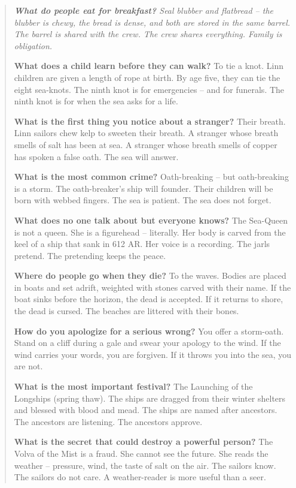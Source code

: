 \documentclass[12pt,oneside]{book}
\newenvironment{almanac}
  {\begin{quote}\small\itshape}
  {\end{quote}}
\begin{document}
\vspace{1em}
\begin{almanac}
\textbf{What do people eat for breakfast?} Seal blubber and flatbread -- the blubber is chewy, the bread is dense, and both are stored in the same barrel. The barrel is shared with the crew. The crew shares everything. Family is obligation.

\textbf{What does a child learn before they can walk?} To tie a knot. Linn children are given a length of rope at birth. By age five, they can tie the eight sea-knots. The ninth knot is for emergencies -- and for funerals. The ninth knot is for when the sea asks for a life.

\textbf{What is the first thing you notice about a stranger?} Their breath. Linn sailors chew kelp to sweeten their breath. A stranger whose breath smells of salt has been at sea. A stranger whose breath smells of copper has spoken a false oath. The sea will answer.

\textbf{What is the most common crime?} Oath-breaking -- but oath-breaking is a storm. The oath-breaker's ship will founder. Their children will be born with webbed fingers. The sea is patient. The sea does not forget.

\textbf{What does no one talk about but everyone knows?} The Sea-Queen is not a queen. She is a figurehead -- literally. Her body is carved from the keel of a ship that sank in 612 AR. Her voice is a recording. The jarls pretend. The pretending keeps the peace.

\textbf{Where do people go when they die?} To the waves. Bodies are placed in boats and set adrift, weighted with stones carved with their name. If the boat sinks before the horizon, the dead is accepted. If it returns to shore, the dead is cursed. The beaches are littered with their bones.

\textbf{How do you apologize for a serious wrong?} You offer a storm-oath. Stand on a cliff during a gale and swear your apology to the wind. If the wind carries your words, you are forgiven. If it throws you into the sea, you are not.

\textbf{What is the most important festival?} The Launching of the Longships (spring thaw). The ships are dragged from their winter shelters and blessed with blood and mead. The ships are named after ancestors. The ancestors are listening. The ancestors approve.

\textbf{What is the secret that could destroy a powerful person?} The Volva of the Mist is a fraud. She cannot see the future. She reads the weather -- pressure, wind, the taste of salt on the air. The sailors know. The sailors do not care. A weather-reader is more useful than a seer.
\end{almanac}
\end{document}
